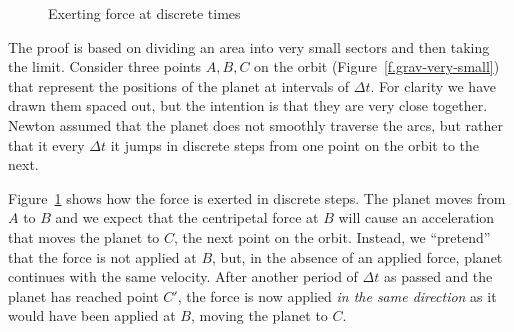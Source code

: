\begin{figure}[b]
\begin{minipage}{.48\textwidth}
\begin{center}
\caption{Exerting force at discrete times}\label{f.grav-small}
\end{center}
\end{minipage}
\end{figure}


The proof is based on dividing an area into very small sectors and then taking the limit. Consider three points $A,B,C$ on the orbit (Figure~\ref{f.grav-very-small}) that represent the positions of the planet at intervals of $\Delta t$. For clarity we have drawn them spaced out, but the intention is that they are very close together. Newton assumed that the planet does not smoothly traverse the arcs, but rather that it every $\Delta t$ it jumps in discrete steps from one point on the orbit to the next.

Figure~\ref{f.grav-small} shows how the force is exerted in discrete steps. The planet moves from $A$ to $B$ and we expect that the centripetal force at $B$ will cause an acceleration that moves the planet to $C$, the next point on the orbit. Instead, we ``pretend'' that the force is not applied at $B$, but, in the absence of an applied force, planet continues with the same velocity. After another period of $\Delta t$ as passed and the planet has reached point $C'$, the force is now applied \emph{in the same direction} as it would have been applied at $B$, moving the planet to $C$. 

